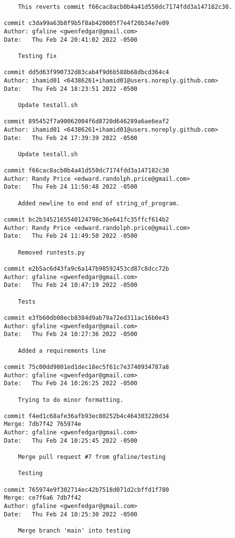 {\begin{verbatim}
    This reverts commit f66cac8acb0b4a41d550dc7174fdd3a147182c30.

commit c3da99a63b8f9b5f8ab420005f7e4f20b34e7e09
Author: gfaline <gwenfedgar@gmail.com>
Date:   Thu Feb 24 20:41:02 2022 -0500

    Testing fix

commit dd5d63f990732d83cab4f9d6b588b68dbcd364c4
Author: ihamid01 <64386261+ihamid01@users.noreply.github.com>
Date:   Thu Feb 24 18:23:51 2022 -0500

    Update testall.sh

commit 895452f7a90062004f6d8720d646289a6ae6eaf2
Author: ihamid01 <64386261+ihamid01@users.noreply.github.com>
Date:   Thu Feb 24 17:39:39 2022 -0500

    Update testall.sh

commit f66cac8acb0b4a41d550dc7174fdd3a147182c30
Author: Randy Price <edward.randolph.price@gmail.com>
Date:   Thu Feb 24 11:50:48 2022 -0500

    Added newline to end end of string_of_program.

commit bc2b3452165540124798c36e641fc35ffcf614b2
Author: Randy Price <edward.randolph.price@gmail.com>
Date:   Thu Feb 24 11:49:50 2022 -0500

    Removed runtests.py

commit e2b5ac6d43fa9c6a147b98592453cd87c8dcc72b
Author: gfaline <gwenfedgar@gmail.com>
Date:   Thu Feb 24 10:47:19 2022 -0500

    Tests

commit e3fb60db08ecb8384d9ab79a72ed311ac16b0e43
Author: gfaline <gwenfedgar@gmail.com>
Date:   Thu Feb 24 10:27:36 2022 -0500

    Added a requirements line

commit 75c00dd9801ed1dec18ec5f61c7e3740934787a8
Author: gfaline <gwenfedgar@gmail.com>
Date:   Thu Feb 24 10:26:25 2022 -0500

    Trying to do minor formatting.

commit f4ed1c68afe36afb93ec80252b4c464303220d34
Merge: 7db7f42 765974e
Author: gfaline <gwenfedgar@gmail.com>
Date:   Thu Feb 24 10:25:45 2022 -0500

    Merge pull request #7 from gfaline/testing
    
    Testing

commit 765974e9f302714ec42b7518d071d2cbffd1f780
Merge: ce7f6a6 7db7f42
Author: gfaline <gwenfedgar@gmail.com>
Date:   Thu Feb 24 10:25:30 2022 -0500

    Merge branch 'main' into testing


\end{verbatim}}
